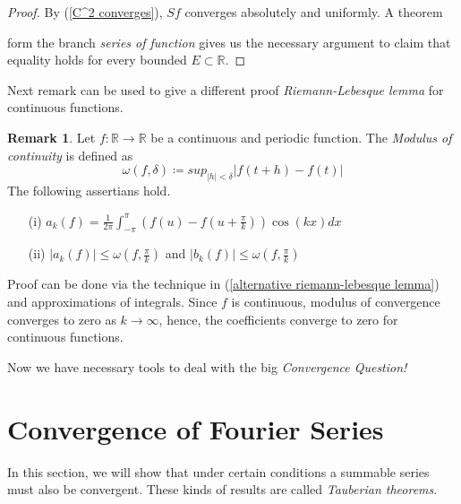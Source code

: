\documentclass[12pt]{amsart}
\theoremstyle{definition}
\newtheorem{remark}[theorem]{Remark}
\newcommand{\RR}{{\mathbb R}} %
\begin{document}
\begin{proof}
    By (\ref{C^2 converges}), $Sf$ converges absolutely and uniformly. A theorem\footnotemark{}


    form the branch \emph{series of function} gives us the necessary argument to claim that equality holds for every bounded $E \subset \RR$.





\end{proof}


Next remark can be used to give a different proof \emph{Riemann-Lebesque lemma} for continuous functions.


\begin{remark}
    Let $f: \RR \to \RR$ be a continuous and periodic function. The \emph{Modulus of continuity} is defined as
    \[
    \omega(f, \delta) \coloneqq sup_{|h| < \delta}|f(t+h) - f(t)|
    \] The following assertians hold.
    \begin{itemize}
        \item[(i)] $a_k(f) = \frac{1}{2\pi}  \int_{-\pi}^{\pi} (f(u) - f(u + \frac{\pi}{k}))\cos(kx)dx$
        \item[(ii)] $|a_k(f)| \leq \omega(f, \frac{\pi}{k})$ and $|b_k(f)| \leq \omega(f, \frac{\pi}{k})$
    \end{itemize}
\end{remark}


Proof can be done via the technique in (\ref{alternative riemann-lebesque lemma}) and approximations of integrals. Since $f$ is continuous, modulus of convergence converges to zero as $k \to \infty$, hence, the coefficients converge to zero for continuous functions.


\par Now we have necessary tools to deal with the big \emph{Convergence Question!}



\section{Convergence of Fourier Series}


In this section, we will show that under certain conditions a summable series must also be convergent. These kinds of results are called \emph{Tauberian theorems}.
\end{document}
